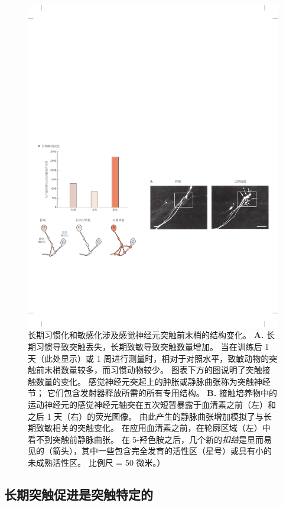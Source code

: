 \begin{figure}[htbp]
	\centering
	\includegraphics[width=0.95\linewidth]{chap53/fig_53_9}
	\caption{长期习惯化和敏感化涉及感觉神经元突触前末梢的结构变化。
		\textbf{A.} 长期习惯导致突触丢失，长期致敏导致突触数量增加。
		当在训练后 1 天（此处显示）或 1 周进行测量时，相对于对照水平，致敏动物的突触前末梢数量较多，而习惯动物较少。
		图表下方的图说明了突触接触数量的变化。
		感觉神经元突起上的肿胀或静脉曲张称为突触神经节；
		它们包含发射器释放所需的所有专用结构\cite{bailey1983morphological}。
		\textbf{B.} 接触培养物中的运动神经元的感觉神经元轴突在五次短暂暴露于血清素之前（左）和之后 1 天（右）的荧光图像。
		由此产生的静脉曲张增加模拟了与长期致敏相关的突触变化。
		在应用血清素之前，在轮廓区域（左）中看不到突触前静脉曲张。
		在 5-羟色胺之后，几个新的\textit{扣结}是显而易见的（箭头），其中一些包含完全发育的活性区（星号）或具有小的未成熟活性区。
		比例尺 = 50 微米\cite{glanzman1990target}。）}
	\label{fig:53_9}
\end{figure}



\subsection{长期突触促进是突触特定的}

